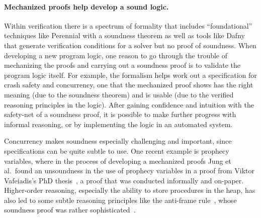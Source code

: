

\paragraph{Mechanized proofs help develop a sound logic.} Within verification
there is a spectrum of formality that includes ``foundational'' techniques like
Perennial with a soundness theorem as well as tools like Dafny that generate
verification conditions for a solver but no proof of soundness. When developing
a new program logic, one reason to go through the trouble of mechanizing the
proofs and carrying out a soundness proof is to validate the program logic
itself. For example, the formalism helps work out a specification for crash
safety and concurrency, one that the mechanized proof shows has the right
meaning (due to the soundness theorem) and is usable (due to the verified
reasoning principles in the logic). After gaining confidence and intuition with
the safety-net of a soundness proof, it is possible to make further progress
with informal reasoning, or by implementing the logic in an automated system.

Concurrency makes soundness especially challenging and important, since specifications can be quite
subtle to use. One recent example is prophecy variables, where in the process of
developing a mechanized proofs Jung et al.\ found an unsoundness in the use of
prophecy variables in a proof from Viktor Vafeiadis's PhD
thesis~\cite{jung:prophecy,vafeiadis-phd}, a proof that was conducted informally
and on-paper. Higher-order reasoning, especially the ability to store procedures
in the heap, has also led to some subtle reasoning principles like the
anti-frame rule~\cite{pottier:anti-frame}, whose soundness proof was rather
sophisticated~\cite{schwinghammer:semantic-anti-frame}.


